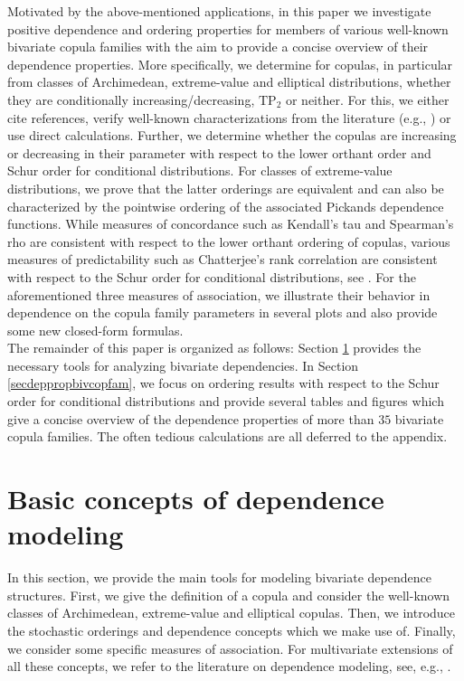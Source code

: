 \documentclass{article}
\newcommand{\TP}{\mathrm{TP_2}}
\begin{document}
Motivated by the above-mentioned applications, in this paper we investigate positive dependence and ordering properties for members of various well-known bivariate copula families with the aim to provide a concise overview of their dependence properties. More specifically, we determine for copulas, in particular from classes of Archimedean, extreme-value and elliptical distributions, whether they are conditionally increasing/decreasing, $\TP$ or neither.
For this, we either cite references, verify well-known characterizations from the literature (e.g., \cite{Durante-2016,Mueller-2005,Nelsen-2006}) or use direct calculations.
Further, we determine whether the copulas are increasing or decreasing in their parameter with respect to the lower orthant order and Schur order for conditional distributions.
For classes of extreme-value distributions, we prove that the latter orderings are equivalent and can also be characterized by the pointwise ordering of the associated Pickands dependence functions.
While measures of concordance such as Kendall's tau and Spearman's rho are consistent with respect to the lower orthant ordering of copulas, various measures of predictability such as Chatterjee's rank correlation are consistent with respect to the Schur order for conditional distributions, see \cite{Ansari-Fuchs-2023}.
For the aforementioned three measures of association, we illustrate their behavior in dependence on the copula family parameters in several plots and also provide some new closed-form formulas. \\
The remainder of this paper is organized as follows: Section \ref{sec2} provides the necessary tools for analyzing bivariate dependencies.
In Section \ref{secdeppropbivcopfam}, we focus on ordering results with respect to the Schur order for conditional distributions and provide several tables and figures which give a concise overview of the dependence properties of more than \(35\) bivariate copula families.
The often tedious calculations are all deferred to the appendix.

\section{Basic concepts of dependence modeling}\label{sec2}

In this section, we provide the main tools for modeling bivariate dependence structures.
First, we give the definition of a copula and consider the well-known classes of Archimedean, extreme-value and elliptical copulas.
Then, we introduce the stochastic orderings and dependence concepts which we make use of.
Finally, we consider some specific measures of association.
For multivariate extensions of all these concepts, we refer to the literature on dependence modeling, see, e.g., \cite{Durante-2016,Nelsen-2006}.
\end{document}
